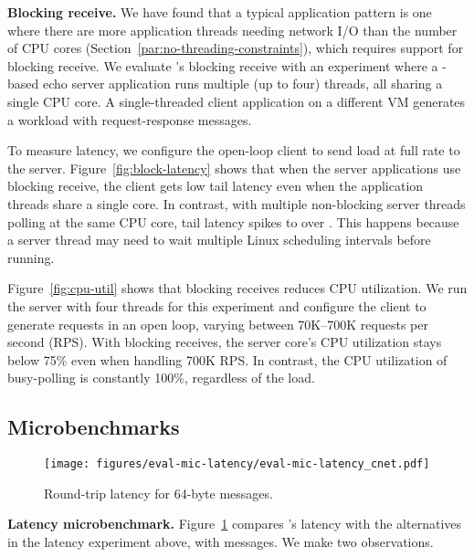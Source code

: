 \textbf{Blocking receive.} We have found that a typical application pattern is one where there are more application threads needing network I/O than the number of CPU cores (Section~\ref{par:no-threading-constraints}), which requires support for blocking receive.
We evaluate \mt{}'s blocking receive with an experiment where a \mt{}-based echo server application runs multiple (up to four) threads, all sharing a single CPU core.
A single-threaded client application on a different VM generates a workload with  request-response messages.

To measure latency, we configure the open-loop client to send load at full rate to the server.
Figure~\ref{fig:block-latency} shows that when the server applications use blocking receive, the client gets low tail latency even when the application threads share a single core.
In contrast, with multiple non-blocking server threads polling at the same CPU core, tail latency spikes to over .
This happens because a server thread may need to wait multiple Linux scheduling intervals before running.

Figure~\ref{fig:cpu-util} shows that blocking receives reduces CPU utilization.
We run the server with four threads for this experiment and configure the client to generate requests in an open loop, varying between 70K--700K requests per second (RPS).
With blocking receives, the server core's CPU utilization stays below 75\% even when handling 700K RPS.
In contrast, the CPU utilization of busy-polling is constantly 100\%, regardless of the load.
\subsection{Microbenchmarks}
\label{subsec:microbenchm}



\begin{figure}[t!]
\centering
\texttt{[image: figures/eval-mic-latency/eval-mic-latency\_cnet.pdf]}
\caption{Round-trip latency for 64-byte messages.}
\label{fig:eval-micro-lat}
\vspace{-0.3cm}
\end{figure}

\label{subsec:eval-latency}
\textbf{Latency microbenchmark.} Figure~\ref{fig:eval-micro-lat} compares \mt{}'s latency with the alternatives in the latency experiment above, with  messages.
We make two observations.

